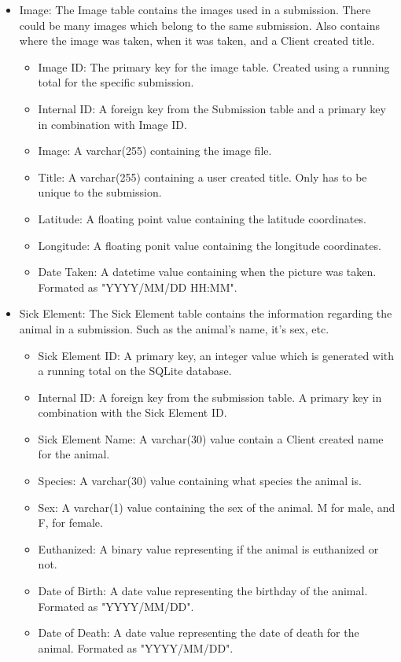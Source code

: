\documentclass[onecolumn, draftclsnofoot,10pt, compsoc]{IEEEtran}
\begin{document}
\begin{itemize}
\item Image:\newline
The Image table contains the images used in a submission. There could be many images which belong to the same submission. Also contains where the image was taken, when it was taken, and a Client created title.
\begin{itemize}
\item Image ID: The primary key for the image table. Created using a running total for the specific submission.
\item Internal ID: A foreign key from the Submission table and a primary key in combination with Image ID.
\item Image: A varchar(255) containing the image file.
\item Title: A varchar(255) containing a user created title. Only has to be unique to the submission.
\item Latitude: A floating point value containing the latitude coordinates.
\item Longitude: A floating ponit value containing the longitude coordinates.
\item Date Taken: A datetime value containing when the picture was taken. Formated as "YYYY/MM/DD HH:MM".
\end{itemize}

\item Sick Element:\newline
The Sick Element table contains the information regarding the animal in a submission. Such as the animal's name, it's sex, etc.
\begin{itemize}
\item Sick Element ID: A primary key, an integer value which is generated with a running total on the SQLite database.
\item Internal ID: A foreign key from the submission table. A primary key in combination with the Sick Element ID.
\item Sick Element Name: A varchar(30) value contain a Client created name for the animal.
\item Species: A varchar(30) value containing what species the animal is.
\item Sex: A varchar(1) value containing the sex of the animal. M for male, and F, for female.
\item Euthanized: A binary value representing if the animal is euthanized or not.
\item Date of Birth: A date value representing the birthday of the animal. Formated as "YYYY/MM/DD".
\item Date of Death: A date value representing the date of death for the animal. Formated as "YYYY/MM/DD".
\end{itemize}


\end{itemize}
\end{document}
